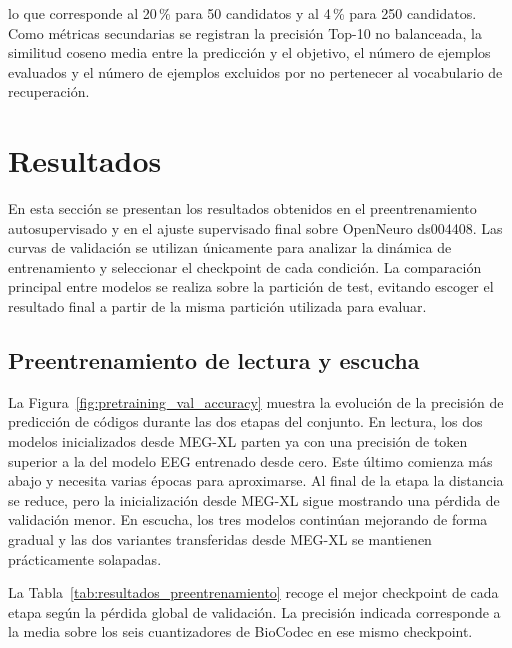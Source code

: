 \noindent lo que corresponde al 20\,\% para 50 candidatos y al 4\,\% para 250 candidatos. Como métricas secundarias se registran la precisión Top-10 no balanceada, la similitud coseno media entre la predicción y el objetivo, el número de ejemplos evaluados y el número de ejemplos excluidos por no pertenecer al vocabulario de recuperación.

\section{Resultados}

En esta sección se presentan los resultados obtenidos en el preentrenamiento autosupervisado y en el ajuste supervisado final sobre OpenNeuro ds004408. Las curvas de validación se utilizan únicamente para analizar la dinámica de entrenamiento y seleccionar el checkpoint de cada condición. La comparación principal entre modelos se realiza sobre la partición de test, evitando escoger el resultado final a partir de la misma partición utilizada para evaluar.

\subsection{Preentrenamiento de lectura y escucha}

La Figura~\ref{fig:pretraining_val_accuracy} muestra la evolución de la precisión de predicción de códigos durante las dos etapas del conjunto. En lectura, los dos modelos inicializados desde MEG-XL parten ya con una precisión de token superior a la del modelo EEG entrenado desde cero. Este último comienza más abajo y necesita varias épocas para aproximarse. Al final de la etapa la distancia se reduce, pero la inicialización desde MEG-XL sigue mostrando una pérdida de validación menor. En escucha, los tres modelos continúan mejorando de forma gradual y las dos variantes transferidas desde MEG-XL se mantienen prácticamente solapadas.



La Tabla~\ref{tab:resultados_preentrenamiento} recoge el mejor checkpoint de cada etapa según la pérdida global de validación. La precisión indicada corresponde a la media sobre los seis cuantizadores de BioCodec en ese mismo checkpoint.


